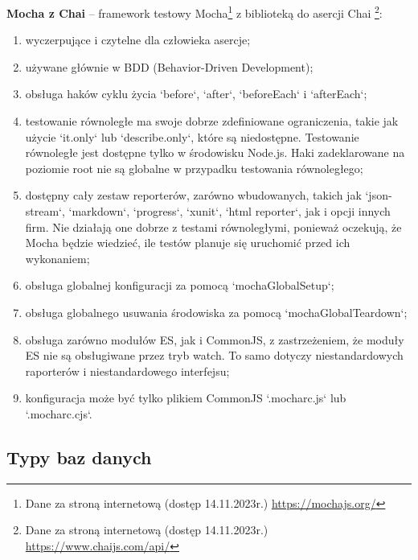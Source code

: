 \documentclass[12pt, a4paper, twoside, openany]{book}
\begin{document}
\textbf{Mocha z Chai} -- framework testowy Mocha\footnote{Dane za stroną internetową (dostęp 14.11.2023r.) \url{https://mochajs.org/}} z biblioteką do asercji Chai \footnote{Dane za stroną internetową (dostęp 14.11.2023r.) \url{https://www.chaijs.com/api/}}:
\begin{enumerate}[label=--]
    \item wyczerpujące i czytelne dla człowieka asercje;
    \item używane głównie w BDD (Behavior-Driven Development);
    \item obsługa haków cyklu życia `before`, `after`, `beforeEach` i `afterEach`;
    \item testowanie równoległe ma swoje dobrze zdefiniowane ograniczenia, takie jak użycie `it.only` lub `describe.only`, które są niedostępne. Testowanie równoległe jest dostępne tylko w środowisku Node.js. Haki zadeklarowane na poziomie root nie są globalne w przypadku testowania równoległego;
    \item dostępny cały zestaw reporterów, zarówno wbudowanych, takich jak `json-stream`, `markdown`, `progress`, `xunit`, `html reporter`, jak i opcji innych firm. Nie działają one dobrze z testami równoległymi, ponieważ oczekują, że Mocha będzie wiedzieć, ile testów planuje się uruchomić przed ich wykonaniem;
    \item obsługa globalnej konfiguracji za pomocą `mochaGlobalSetup`;
    \item obsługa globalnego usuwania środowiska za pomocą `mochaGlobalTeardown`;
    \item obsługa zarówno modułów ES, jak i CommonJS, z zastrzeżeniem, że moduły ES nie są obsługiwane przez tryb watch. To samo dotyczy niestandardowych raporterów i niestandardowego interfejsu;
    \item konfiguracja może być tylko plikiem CommonJS `.mocharc.js` lub `.mocharc.cjs`.
\end{enumerate}

\subsection{Typy baz danych}
\end{document}
